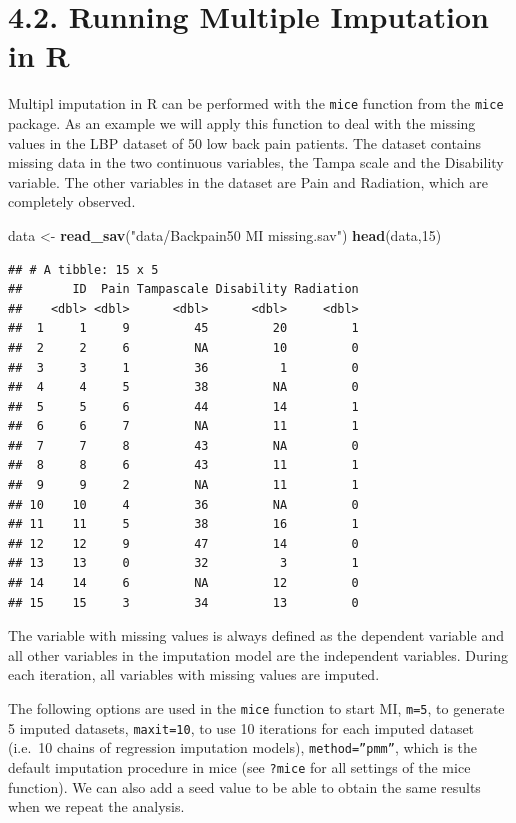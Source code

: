 \documentclass[]{book}
\newenvironment{Shaded}{\begin{snugshade}}{\end{snugshade}}
\newcommand{\KeywordTok}[1]{\textcolor[rgb]{0.13,0.29,0.53}{\textbf{#1}}}
\newcommand{\DecValTok}[1]{\textcolor[rgb]{0.00,0.00,0.81}{#1}}
\newcommand{\StringTok}[1]{\textcolor[rgb]{0.31,0.60,0.02}{#1}}
\newcommand{\NormalTok}[1]{#1}
\begin{document}
\section{4.2. Running Multiple Imputation in
R}\label{running-multiple-imputation-in-r}

Multipl imputation in R can be performed with the \texttt{mice} function
from the \texttt{mice} package. As an example we will apply this
function to deal with the missing values in the LBP dataset of 50 low
back pain patients. The dataset contains missing data in the two
continuous variables, the Tampa scale and the Disability variable. The
other variables in the dataset are Pain and Radiation, which are
completely observed.

\begin{Shaded}
\begin{Highlighting}[]
\NormalTok{data <-}\StringTok{ }\KeywordTok{read_sav}\NormalTok{(}\StringTok{"data/Backpain50 MI missing.sav"}\NormalTok{)}
\KeywordTok{head}\NormalTok{(data,}\DecValTok{15}\NormalTok{)}
\end{Highlighting}
\end{Shaded}

\begin{verbatim}
## # A tibble: 15 x 5
##       ID  Pain Tampascale Disability Radiation
##    <dbl> <dbl>      <dbl>      <dbl>     <dbl>
##  1     1     9         45         20         1
##  2     2     6         NA         10         0
##  3     3     1         36          1         0
##  4     4     5         38         NA         0
##  5     5     6         44         14         1
##  6     6     7         NA         11         1
##  7     7     8         43         NA         0
##  8     8     6         43         11         1
##  9     9     2         NA         11         1
## 10    10     4         36         NA         0
## 11    11     5         38         16         1
## 12    12     9         47         14         0
## 13    13     0         32          3         1
## 14    14     6         NA         12         0
## 15    15     3         34         13         0
\end{verbatim}

The variable with missing values is always defined as the dependent
variable and all other variables in the imputation model are the
independent variables. During each iteration, all variables with missing
values are imputed.

The following options are used in the \texttt{mice} function to start
MI, \texttt{m=5}, to generate 5 imputed datasets, \texttt{maxit=10}, to
use 10 iterations for each imputed dataset (i.e.~10 chains of regression
imputation models), \texttt{method=”pmm”}, which is the default
imputation procedure in mice (see \texttt{?mice} for all settings of the
mice function). We can also add a seed value to be able to obtain the
same results when we repeat the analysis.
\end{document}
